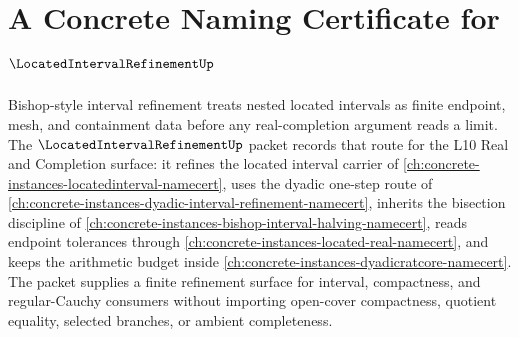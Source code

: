 \chapter{A Concrete Naming Certificate for $\LocatedIntervalRefinementUp$}
\label{ch:concrete-instances-located-interval-refinement-namecert}

Bishop-style interval refinement treats nested located intervals as finite endpoint, mesh, and containment data before any real-completion argument reads a limit. The $\LocatedIntervalRefinementUp$ packet records that route for the L10 Real and Completion surface: it refines the located interval carrier of \autoref{ch:concrete-instances-locatedinterval-namecert}, uses the dyadic one-step route of \autoref{ch:concrete-instances-dyadic-interval-refinement-namecert}, inherits the bisection discipline of \autoref{ch:concrete-instances-bishop-interval-halving-namecert}, reads endpoint tolerances through \autoref{ch:concrete-instances-located-real-namecert}, and keeps the arithmetic budget inside \autoref{ch:concrete-instances-dyadicratcore-namecert}. The packet supplies a finite refinement surface for interval, compactness, and regular-Cauchy consumers without importing open-cover compactness, quotient equality, selected branches, or ambient completeness.


